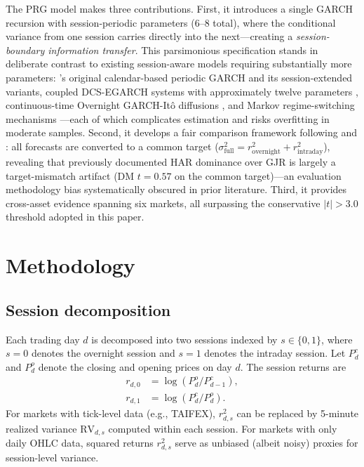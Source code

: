 \documentclass[11pt,a4paper]{article}
\begin{document}
The PRG model makes three contributions. First, it introduces a single GARCH recursion with session-periodic parameters (6--8 total), where the conditional variance from one session carries directly into the next---creating a \emph{session-boundary information transfer}. This parsimonious specification stands in deliberate contrast to existing session-aware models requiring substantially more parameters: \citet{Bollerslev1996}'s original calendar-based periodic GARCH and its session-extended variants, coupled DCS-EGARCH systems with approximately twelve parameters \citep{Linton2020}, continuous-time Overnight GARCH-It\^{o} diffusions \citep{Kim2023}, and Markov regime-switching mechanisms \citep{Lai2024}---each of which complicates estimation and risks overfitting in moderate samples. Second, it develops a fair comparison framework following \citet{Hansen2006} and \citet{Patton2011}: all forecasts are converted to a common target ($\sigma^2_{\text{full}} = r^2_{\text{overnight}} + r^2_{\text{intraday}}$), revealing that previously documented HAR dominance over GJR is largely a target-mismatch artifact (DM $t = 0.57$ on the common target)---an evaluation methodology bias systematically obscured in prior literature. Third, it provides cross-asset evidence spanning six markets, all surpassing the conservative $|t| > 3.0$ threshold adopted in this paper.


\section{Methodology}

\subsection{Session decomposition}

Each trading day $d$ is decomposed into two sessions indexed by $s \in \{0, 1\}$, where $s = 0$ denotes the overnight session and $s = 1$ denotes the intraday session. Let $P^{c}_d$ and $P^{o}_d$ denote the closing and opening prices on day $d$. The session returns are
\begin{align}
    r_{d,0} &= \log(P^{o}_d / P^{c}_{d-1}), \label{eq:r_overnight} \\
    r_{d,1} &= \log(P^{c}_d / P^{o}_d). \label{eq:r_intraday}
\end{align}
For markets with tick-level data (e.g., TAIFEX), $r^2_{d,s}$ can be replaced by 5-minute realized variance $\text{RV}_{d,s}$ computed within each session. For markets with only daily OHLC data, squared returns $r^2_{d,s}$ serve as unbiased (albeit noisy) proxies for session-level variance.
\end{document}
